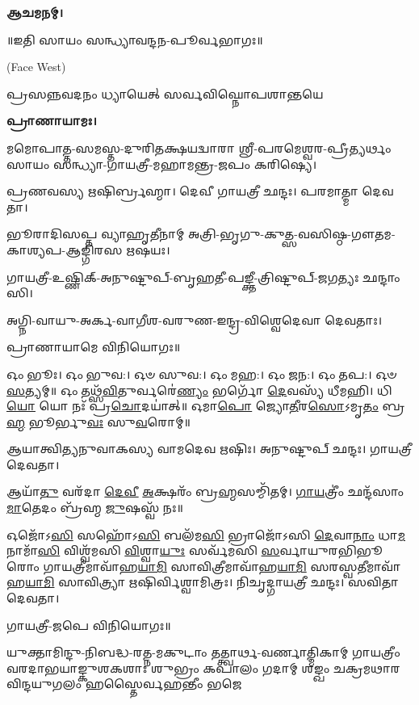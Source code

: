 \textbf{𑌆𑌚𑌮𑌨𑌮𑍍।}


\centerline{॥𑌇𑌤𑌿 𑌸𑌾𑌯𑌂 𑌸𑌨𑍍𑌧𑍍𑌯𑌾𑌵𑌨𑍍𑌦𑌨-𑌪𑍂𑌰𑍍𑌵𑌭𑌾𑌗𑌃॥}



{\scriptsize (Face West)}

{𑌪𑍍𑌰𑌸𑌨𑍍𑌨𑌵𑌦𑌨𑌂 𑌧𑍍𑌯𑌾𑌯𑍇𑌤𑍍 𑌸𑌰𑍍𑌵𑌵𑌿𑌘𑍍𑌨𑍋𑌪𑌶𑌾𑌨𑍍𑌤𑌯𑍇}

\textbf{𑌪𑍍𑌰𑌾𑌣𑌾𑌯𑌾𑌮𑌃।}

𑌮𑌮𑍋𑌪𑌾𑌤𑍍𑌤-𑌸𑌮𑌸𑍍𑌤-𑌦𑍁𑌰𑌿𑌤𑌕𑍍𑌷𑌯𑌦𑍍𑌵𑌾𑌰𑌾 𑌶𑍍𑌰𑍀-𑌪𑌰𑌮𑍇𑌶𑍍𑌵𑌰-𑌪𑍍𑌰𑍀𑌤𑍍𑌯𑌰𑍍𑌥𑌂 𑌸𑌾𑌯𑌂 𑌸𑌨𑍍𑌧𑍍𑌯𑌾-𑌗𑌾𑌯𑌤𑍍𑌰𑍀-𑌮𑌹𑌾𑌮𑌨𑍍𑌤𑍍𑌰-𑌜𑌪𑌂 𑌕𑌰𑌿𑌷𑍍𑌯𑍇।


𑌪𑍍𑌰𑌣𑌵𑌸𑍍𑌯 𑌋𑌷𑌿𑌰𑍍𑌬𑍍𑌰𑌹𑍍𑌮𑌾।
𑌦𑍇𑌵𑍀 𑌗𑌾𑌯𑌤𑍍𑌰𑍀 𑌛𑌨𑍍𑌦𑌃।
𑌪𑌰𑌮𑌾𑌤𑍍𑌮𑌾 𑌦𑍇𑌵𑌤𑌾।

𑌭𑍂𑌰𑌾𑌦𑌿𑌸𑌪𑍍𑌤 𑌵𑍍𑌯𑌾𑌹𑍃𑌤𑍀𑌨𑌾𑌮𑍍 𑌅𑌤𑍍𑌰𑌿-𑌭𑍃𑌗𑍁-𑌕𑍁𑌤𑍍𑌸-𑌵𑌸𑌿𑌷𑍍𑌠-𑌗𑍗𑌤𑌮-𑌕𑌾𑌶𑍍𑌯𑌪-𑌆𑌙𑍍𑌗𑌿𑌰𑌸 𑌋𑌷𑌯𑌃।

𑌗𑌾𑌯𑌤𑍍𑌰𑍀-𑌉𑌷𑍍𑌣𑌿𑌕𑍍-𑌅𑌨𑍁𑌷𑍍𑌟𑍁𑌪𑍍-𑌬𑍃𑌹𑌤𑍀-𑌪𑌙𑍍𑌕𑍍𑌤𑍀-𑌤𑍍𑌰𑌿𑌷𑍍𑌟𑍁𑌪𑍍-𑌜𑌗𑌤𑍍𑌯𑌃 𑌛𑌨𑍍𑌦𑌾𑌂𑌸𑌿।

𑌅𑌗𑍍𑌨𑌿-𑌵𑌾𑌯𑍁-𑌅𑌰𑍍𑌕-𑌵𑌾𑌗𑍀𑌶-𑌵𑌰𑍁𑌣-𑌇𑌨𑍍𑌦𑍍𑌰-𑌵𑌿𑌶𑍍𑌵𑍇𑌦𑍇𑌵𑌾 𑌦𑍇𑌵𑌤𑌾𑌃।
      
𑌪𑍍𑌰𑌾𑌣𑌾𑌯𑌾𑌮𑍇 𑌵𑌿𑌨𑌿𑌯𑍋𑌗𑌃॥


𑌓𑌂 𑌭𑍂𑌃। 𑌓𑌂 𑌭𑍁𑌵:। 𑌓𑍞 𑌸𑍁𑌵:। 𑌓𑌂 𑌮𑌹:। 𑌓𑌂 𑌜𑌨:। 𑌓𑌂 𑌤𑌪:। 𑌓𑍞 \ul{𑌸}\-𑌤𑍍𑌯𑌮𑍍॥
𑌓𑌂 𑌤𑌥𑍍𑌸᳴\-\ul{𑌵𑌿}\-𑌤𑍁𑌰𑍍𑌵𑌰𑍇॑\-\ul{𑌣𑍍𑌯𑌂} 𑌭𑌰𑍍𑌗𑍋᳴ \ul{𑌦𑍇}\-𑌵𑌸𑍍𑌯᳴ 𑌧𑍀𑌮𑌹𑌿। 𑌧𑌿\-\ul{𑌯𑍋} 𑌯𑍋 𑌨𑌃᳴ 𑌪𑍍𑌰\-\ul{𑌚𑍋}\-𑌦𑌯𑌾॑𑌤𑍍॥
𑌓𑌮𑌾\-\ul{𑌪𑍋} 𑌜𑍍𑌯𑍋\-\ul{𑌤𑍀}\-𑌰\-\ul{𑌸𑍋}\-𑌽𑌮𑍃\-\ul{𑌤𑌂} 𑌬𑍍𑌰\-\ul{𑌹𑍍𑌮} 𑌭𑍂𑌰𑍍𑌭𑍁\-\ul{𑌵𑌃} 𑌸𑍁\-\ul{𑌵}\-𑌰𑍋𑌮𑍍॥




𑌆𑌯𑌾𑌤𑍍𑌵𑌿𑌤𑍍𑌯𑌨𑍁𑌵𑌾𑌕𑌸𑍍𑌯 𑌵𑌾𑌮𑌦𑍇𑌵 𑌋𑌷𑌿𑌃।
𑌅𑌨𑍁𑌷𑍍𑌟𑍁𑌪𑍍 𑌛𑌨𑍍𑌦𑌃।
𑌗𑌾𑌯𑌤𑍍𑌰𑍀 𑌦𑍇𑌵𑌤𑌾।

𑌆𑌯𑌾᳴\-\ul{𑌤𑍁} 𑌵𑌰᳴𑌦𑌾 \ul{𑌦𑍇}\-\-\ul{𑌵𑍀} \ul{𑌅}\-𑌕𑍍𑌷𑌰𑌂᳴ 𑌬𑍍𑌰\-\ul{𑌹𑍍𑌮}\-𑌸𑌮𑍍𑌮𑌿᳴𑌤𑌮𑍍। \ul{𑌗𑌾}\-\-\ul{𑌯}\-𑌤𑍍𑌰𑍀𑌂॑ 𑌛𑌨𑍍𑌦᳴𑌸𑌾𑌂 \ul{𑌮𑌾}\-𑌤𑍇𑌦𑌂 𑌬𑍍𑌰᳴𑌹𑍍𑌮 \ul{𑌜𑍁}\-𑌷𑌸𑍍𑌵᳴ 𑌨𑌃॥

𑌓𑌜𑍋᳴𑌽\-\ul{𑌸𑌿} 𑌸𑌹𑍋᳴𑌽\-\ul{𑌸𑌿} 𑌬𑌲᳴𑌮\-\ul{𑌸𑌿} 𑌭𑍍𑌰𑌾𑌜𑍋᳴𑌽𑌸𑌿 \ul{𑌦𑍇}\-𑌵𑌾\-\ul{𑌨𑌾𑌂} 𑌧𑌾\-\ul{𑌮} 𑌨𑌾𑌮𑌾᳴\-\ul{𑌸𑌿} 𑌵𑌿𑌶𑍍𑌵᳴𑌮𑌸𑌿 \ul{𑌵𑌿}\-𑌶𑍍𑌵𑌾\-\ul{𑌯𑍁𑌃} 𑌸𑌰𑍍𑌵᳴𑌮𑌸𑌿 \ul{𑌸}\-𑌰𑍍𑌵𑌾𑌯𑍁𑌰𑌭𑌿𑌭𑍂𑌰𑍋𑌂 𑌗𑌾𑌯𑌤𑍍𑌰𑍀𑌮𑌾𑌵𑌾᳴𑌹\-\ul{𑌯𑌾}\-\-\ul{𑌮𑌿} 𑌸𑌾𑌵𑌿𑌤𑍍𑌰𑍀𑌮𑌾𑌵𑌾᳴𑌹\-\ul{𑌯𑌾}\-\-\ul{𑌮𑌿} 𑌸𑌰𑌸𑍍𑌵𑌤𑍀𑌮𑌾𑌵𑌾᳴𑌹\-\-\ul{𑌯𑌾}\-\-\ul{𑌮𑌿} 𑌸𑌾𑌵𑌿𑌤𑍍𑌰𑍍𑌯𑌾 𑌋𑌷𑌿𑌰𑍍𑌵𑌿𑌶𑍍𑌵𑌾𑌮𑌿𑌤𑍍𑌰𑌃। 𑌨𑌿𑌚𑍃𑌦𑍍𑌗𑌾𑌯𑌤𑍍𑌰𑍀 𑌛𑌨𑍍𑌦𑌃। 𑌸𑌵𑌿𑌤𑌾 𑌦𑍇𑌵𑌤𑌾।

𑌗𑌾𑌯𑌤𑍍𑌰𑍀-𑌜𑌪𑍇 𑌵𑌿𑌨𑌿𑌯𑍋𑌗𑌃॥



{𑌯𑍁𑌕𑍍𑌤𑌾𑌮𑌿𑌨𑍍𑌦𑍁-𑌨𑌿𑌬𑌦𑍍𑌧-𑌰𑌤𑍍𑌨-𑌮𑌕𑍁𑌟𑌾𑌂 𑌤𑌤𑍍𑌤𑍍𑌵𑌾𑌰𑍍𑌥-𑌵𑌰𑍍𑌣𑌾𑌤𑍍𑌮𑌿𑌕𑌾𑌮𑍍}
{𑌗𑌾𑌯𑌤𑍍𑌰𑍀𑌂 𑌵𑌰𑌦𑌾𑌭𑌯𑌾𑌙𑍍𑌕𑍁𑌶𑌕𑌶𑌾𑌃 𑌶𑍁𑌭𑍍𑌰𑌂 𑌕𑌪𑌾𑌲𑌂 𑌗𑌦𑌾𑌮𑍍}
{𑌶𑌙𑍍𑌖𑌂 𑌚𑌕𑍍𑌰𑌮𑌥𑌾𑌰𑌵𑌿𑌨𑍍𑌦𑌯𑍁𑌗𑌲𑌂 𑌹𑌸𑍍𑌤𑍈𑌰𑍍𑌵𑌹𑌨𑍍𑌤𑍀𑌂 𑌭𑌜𑍇}


